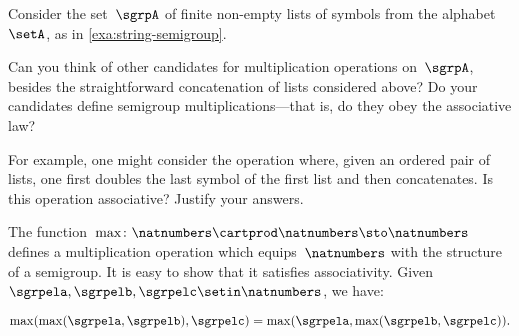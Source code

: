 
\begin{gradedexercise}
    \label{ex:VariationsOnConcatenation}
    \label{ex:alphabet}
    Consider the set~$\sgrpA$ of finite non-empty lists of symbols from the alphabet~$\setA$, as in \cref{exa:string-semigroup}.

    Can you think of other candidates for multiplication operations on~$\sgrpA$, besides the straightforward concatenation of lists considered above?
    Do your candidates define semigroup multiplications---that is, do they obey the associative law?

    For example, one might consider the operation where, given an ordered pair of lists, one first doubles the last symbol of the first list and then concatenates.
    Is this operation associative?
    Justify your answers.
\end{gradedexercise}

\begin{example}
    \label{max-semigroup}

    The function~$\max \colon \natnumbers \cartprod \natnumbers \sto \natnumbers$ defines a multiplication operation which equips~$\natnumbers$ with the structure of a semigroup.
    It is easy to show that it satisfies associativity.
    Given~$\sgrpela,\sgrpelb,\sgrpelc\setin \natnumbers$, we have:

    \begin{equation}
        \label{eq:max-assoc}
        \max(\max(\sgrpela,\sgrpelb),\sgrpelc)
        =
        \max(\sgrpela,\max(\sgrpelb,\sgrpelc)).
    \end{equation}
\end{example}

